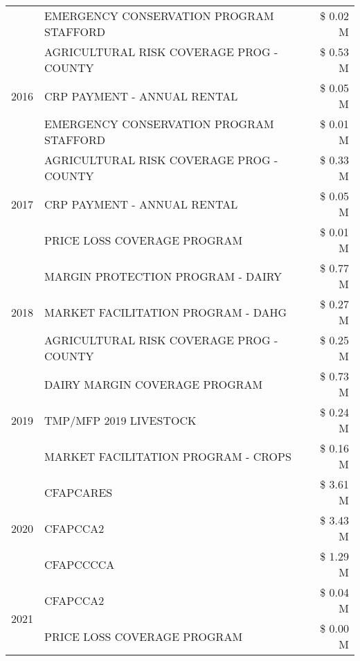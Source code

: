 \begin{tabular}{llr}
 & EMERGENCY CONSERVATION PROGRAM STAFFORD & \$ 0.02 M \\
\cline{1-3}
\multirow[t]{3}{*}{2016} & AGRICULTURAL RISK COVERAGE PROG - COUNTY & \$ 0.53 M \\
 & CRP PAYMENT - ANNUAL RENTAL & \$ 0.05 M \\
 & EMERGENCY CONSERVATION PROGRAM STAFFORD & \$ 0.01 M \\
\cline{1-3}
\multirow[t]{3}{*}{2017} & AGRICULTURAL RISK COVERAGE PROG - COUNTY & \$ 0.33 M \\
 & CRP PAYMENT - ANNUAL RENTAL & \$ 0.05 M \\
 & PRICE LOSS COVERAGE PROGRAM & \$ 0.01 M \\
\cline{1-3}
\multirow[t]{3}{*}{2018} & MARGIN PROTECTION PROGRAM - DAIRY & \$ 0.77 M \\
 & MARKET FACILITATION PROGRAM - DAHG & \$ 0.27 M \\
 & AGRICULTURAL RISK COVERAGE PROG - COUNTY & \$ 0.25 M \\
\cline{1-3}
\multirow[t]{3}{*}{2019} & DAIRY MARGIN COVERAGE PROGRAM & \$ 0.73 M \\
 & TMP/MFP 2019 LIVESTOCK & \$ 0.24 M \\
 & MARKET FACILITATION PROGRAM - CROPS & \$ 0.16 M \\
\cline{1-3}
\multirow[t]{3}{*}{2020} & CFAPCARES & \$ 3.61 M \\
 & CFAPCCA2 & \$ 3.43 M \\
 & CFAPCCCCA & \$ 1.29 M \\
\cline{1-3}
\multirow[t]{2}{*}{2021} & CFAPCCA2 & \$ 0.04 M \\
 & PRICE LOSS COVERAGE PROGRAM & \$ 0.00 M \\
\cline{1-3}
\bottomrule
\end{tabular}
